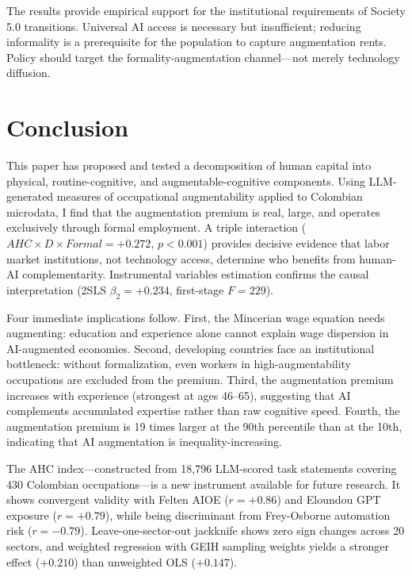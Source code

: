 \documentclass[11pt,a4paper]{article}
\theoremstyle{definition}
\begin{document}
The results provide empirical support for the institutional requirements of Society 5.0 transitions. Universal AI access is necessary but insufficient; reducing informality is a prerequisite for the population to capture augmentation rents. Policy should target the formality-augmentation channel---not merely technology diffusion.


\section{Conclusion}
\label{sec:conclusion}

This paper has proposed and tested a decomposition of human capital into physical, routine-cognitive, and augmentable-cognitive components. Using LLM-generated measures of occupational augmentability applied to Colombian microdata, I find that the augmentation premium is real, large, and operates exclusively through formal employment. A triple interaction ($AHC \times D \times Formal = +0.272$, $p < 0.001$) provides decisive evidence that labor market institutions, not technology access, determine who benefits from human-AI complementarity. Instrumental variables estimation confirms the causal interpretation (2SLS $\beta_2 = +0.234$, first-stage $F = 229$).

Four immediate implications follow. First, the Mincerian wage equation needs augmenting: education and experience alone cannot explain wage dispersion in AI-augmented economies. Second, developing countries face an institutional bottleneck: without formalization, even workers in high-augmentability occupations are excluded from the premium. Third, the augmentation premium increases with experience (strongest at ages 46--65), suggesting that AI complements accumulated expertise rather than raw cognitive speed. Fourth, the augmentation premium is 19 times larger at the 90th percentile than at the 10th, indicating that AI augmentation is inequality-increasing.

The AHC index---constructed from 18,796 LLM-scored task statements covering 430 Colombian occupations---is a new instrument available for future research. It shows convergent validity with Felten AIOE ($r = +0.86$) and Eloundou GPT exposure ($r = +0.79$), while being discriminant from Frey-Osborne automation risk ($r = -0.79$). Leave-one-sector-out jackknife shows zero sign changes across 20 sectors, and weighted regression with GEIH sampling weights yields a stronger effect ($+0.210$) than unweighted OLS ($+0.147$).
\end{document}
